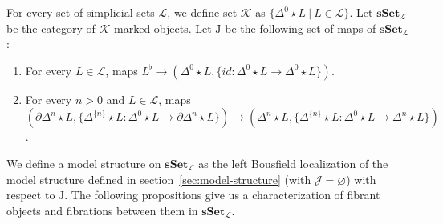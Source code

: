 \documentclass[reqno]{amsart}
\theoremstyle{definition}
\theoremstyle{remark}
\newcommand{\cat}[1]{\mathbf{#1}}
\newcommand{\sSet}{\cat{sSet}}
\newcommand{\K}{$\mathcal{K}$}
\newcommand{\join}{\star}
\newcommand{\J}{\mathrm{J}}
\numberwithin{figure}{section}
\begin{document}
For every set of simplicial sets $\mathcal{L}$, we define set $\mathcal{K}$ as $\{ \Delta^0 \join L\ |\ L \in \mathcal{L} \}$.
Let $\sSet_\mathcal{L}$ be the category of \K-marked objects.
Let $\J$ be the following set of maps of $\sSet_\mathcal{L}$:
\begin{enumerate}
\item For every $L \in \mathcal{L}$, maps $L^\flat \to (\Delta^0 \join L, \{ id : \Delta^0 \join L \to \Delta^0 \join L \})$.
\item For every $n > 0$ and $L \in \mathcal{L}$, maps $(\partial \Delta^n \join L, \{ \Delta^{\{n\}} \join L : \Delta^0 \join L \to \partial \Delta^n \join L \}) \to (\Delta^n \join L, \{ \Delta^{\{n\}} \join L : \Delta^0 \join L \to \Delta^n \join L \})$.
\end{enumerate}
We define a model structure on $\sSet_\mathcal{L}$ as the left Bousfield localization of the model structure
defined in section~\ref{sec:model-structure} (with $\mathcal{J} = \varnothing$) with respect to $\J$.
The following propositions give us a characterization of fibrant objects and fibrations between them in $\sSet_\mathcal{L}$.
\end{document}
